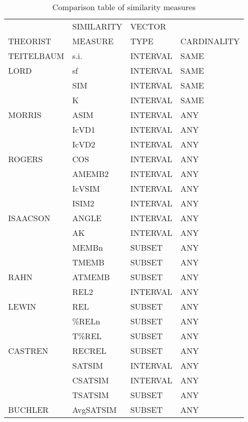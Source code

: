 \documentclass{article}
\begin{document}
\begin{table}[htb]
\caption{Comparison table of similarity measures} 
\begin{center}
\begin{tabular}{llll}
\hline
             &  SIMILARITY  &  VECTOR    &               \\
 THEORIST    &  MEASURE     &  TYPE      &  CARDINALITY  \\
\hline
 TEITELBAUM  &  s.i.        &  INTERVAL  &  SAME         \\
\hline
 LORD        &  sf          &  INTERVAL  &  SAME         \\
\hline
             &  SIM         &  INTERVAL  &  SAME         \\
             &  K           &  INTERVAL  &  SAME         \\
 MORRIS      &  ASIM        &  INTERVAL  &  ANY          \\
\hline
             &  IcVD1       &  INTERVAL  &  ANY          \\
             &  IcVD2       &  INTERVAL  &  ANY          \\
 ROGERS      &  COS         &  INTERVAL  &  ANY          \\
\hline
             &  AMEMB2      &  INTERVAL  &  ANY          \\
             &  IcVSIM      &  INTERVAL  &  ANY          \\
             &  ISIM2       &  INTERVAL  &  ANY          \\
 ISAACSON    &  ANGLE       &  INTERVAL  &  ANY          \\
\hline
             &  AK          &  INTERVAL  &  ANY          \\
             &  MEMBn       &  SUBSET    &  ANY          \\
             &  TMEMB       &  SUBSET    &  ANY          \\
 RAHN        &  ATMEMB      &  SUBSET    &  ANY          \\
\hline
             &  REL2        &  INTERVAL  &  ANY          \\
 LEWIN       &  REL         &  SUBSET    &  ANY          \\
\hline
             &  \%RELn      &  SUBSET    &  ANY          \\
             &  T\%REL      &  SUBSET    &  ANY          \\
 CASTREN     &  RECREL      &  SUBSET    &  ANY          \\
\hline
             &  SATSIM      &  INTERVAL  &  ANY          \\
             &  CSATSIM     &  INTERVAL  &  ANY          \\
             &  TSATSIM     &  SUBSET    &  ANY          \\
 BUCHLER     &  AvgSATSIM   &  SUBSET    &  ANY          \\
\hline
\end{tabular}
\end{center}
\end{table}
\end{document}
